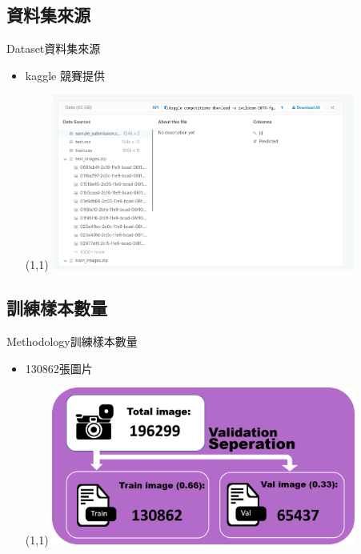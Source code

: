 \documentclass{beamer}
\begin{document}
\begin{CJK}{UTF8}{}
\subsection{資料集來源}

\begin{frame}{Dataset}{資料集來源}
\vspace{-4.5cm}
	\begin{itemize}
	\item{
		kaggle 競賽提供
		\begin{textblock}{3}(1,1)
		\includegraphics[width=10cm]{dataset.png}
		\end{textblock}
	}
	\end{itemize}
\end{frame}

\subsection{訓練樣本數量}

\begin{frame}{Methodology}{訓練樣本數量}
\vspace{-4.5cm}
	\begin{itemize}
	\item{
		130862張圖片
		\begin{textblock}{3}(1,1)
		\includegraphics[width=10cm]{data_split.png}
		\end{textblock}
	}
	\end{itemize}
\end{frame}


\end{CJK}
\end{document}
